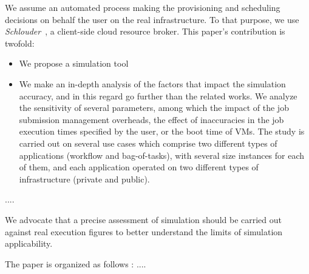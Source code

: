 We assume an automated process  making the provisioning and scheduling decisions
on  behalf  the user  on  the  real infrastructure.   To  that  purpose, we  use
\emph{Schlouder}~\cite{Michon17},  a  client-side  cloud resource  broker.  This
paper's contribution is twofold:
\begin{itemize}
\item We propose a simulation tool
\item We make an  in-depth analysis  of the
factors that impact the simulation accuracy,  and in this regard go further than
the related works. We analyze the sensitivity of several parameters, among which
the  impact  of   the  job  submission  management  overheads,   the  effect  of
inaccuracies in the job execution times specified  by the user, or the boot time
of  VMs.  The  study is  carried out  on several  use cases  which comprise  two
different types of applications (workflow  and bag-of-tasks), with  several size
instances for  each of them, and  each application operated  on two different
types of infrastructure (private and public).
\end{itemize}

....

We advocate  that a precise assessment  of simulation
should be  carried out against real  execution figures to better  understand the
limits  of simulation  applicability. 

The paper is organized as follows : ....


\begin{comment}
These scheduling algorithms of Schlouder have been reimplemented in a simulation
system,  based on  the simulation  toolkit SimGrid~\cite{simgrid08}.   Our study
aims to isolate the different  parameters that influence the simulation accuracy
and what  degree of divergence  between real  execution and simulation  might be
expected in each case.
\end{comment}





